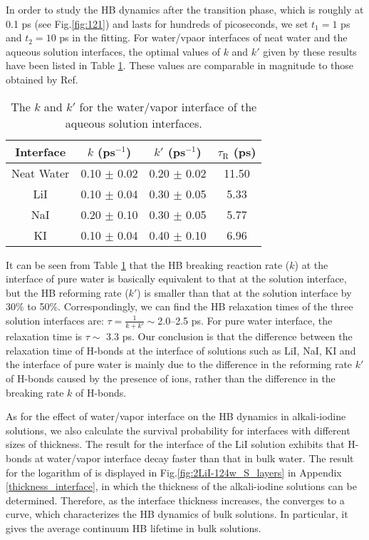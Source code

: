 In order to study the HB dynamics after the transition phase, which is roughly at 0.1 ps (see Fig.\thinspace\ref{fig:121}) and lasts for hundreds of picoseconds, 
we set $t_1 = 1$ ps and $t_2 = 10$ ps in the fitting.
For water/vpaor interfaces of neat water and the aqueous solution interfaces, 
the optimal values of $k$ and $k'$ given by these results have been listed in Table \ref{tab:k_k_prime_pure_and_solutions}. 
These values are comparable in magnitude to those obtained by Ref.%
\begin{table}[htbp]
\centering
\caption{\label{tab:k_k_prime_pure_and_solutions} 
    The $k$ and $k'$ for the water/vapor interface of the aqueous solution interfaces.} 
\begin{tabular}{cccc}
 Interface & $k$ (ps$^{-1}$) & $k'$ (ps$^{-1}$) & $\tau_{\text{R}}$ (ps) \\
\hline
  Neat Water & 0.10 $\pm$ 0.02 & 0.20 $\pm$ 0.02 & 11.50 \\
  LiI & 0.10 $\pm$ 0.04 & 0.30 $\pm$ 0.05 & 5.33 \\
  NaI & 0.20 $\pm$ 0.10 & 0.30 $\pm$ 0.05 & 5.77 \\
  KI  & 0.10 $\pm$ 0.04 & 0.40 $\pm$ 0.10 & 6.96 
\end{tabular}
\end{table}
It can be seen from Table \ref{tab:k_k_prime_pure_and_solutions} that the HB breaking reaction rate ($k$) at the interface of pure water is basically equivalent to 
that at the solution interface, but the HB reforming rate ($k'$) is smaller than that at the solution interface by 30\% to 50\%.
Correspondingly, we can find the HB relaxation times of the three solution interfaces are: $\tau=\frac{1}{k+k'} \sim $2.0--2.5 ps. 
For pure water interface, the relaxation time is $\tau \sim $ 3.3 ps. 
Our conclusion is that the difference between the relaxation time of H-bonds at the interface of solutions such as LiI, NaI, KI 
and the interface of pure water is mainly due to the difference in the reforming rate $k'$ of H-bonds caused by the presence of ions,
rather than the difference in the breaking rate $k$ of H-bonds.

As for the effect of water/vapor interface on the HB dynamics in alkali-iodine solutions,
we also calculate the survival probability for interfaces with different sizes of thickness. 
The result for the interface of the LiI solution exhibits that H-bonds at water/vapor interface decay faster than that in bulk water.
The result for the logarithm of \SHB is displayed in Fig.\space\ref{fig:2LiI-124w_S_layers} in Appendix \ref{thickness_interface}, 
in which the thickness of the alkali-iodine solutions can be determined.
Therefore, as the interface thickness increases, the \SHB converges to a curve, 
which characterizes the HB dynamics of bulk solutions. 
In particular, it gives the average continuum HB lifetime in bulk solutions.
\FloatBarrier
